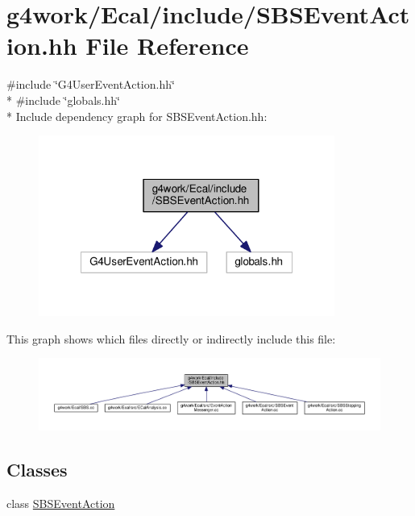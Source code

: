 \hypertarget{_s_b_s_event_action_8hh}{\section{g4work/\-Ecal/include/\-S\-B\-S\-Event\-Action.hh File Reference}
\label{_s_b_s_event_action_8hh}
}
{\ttfamily \#include \char`\"{}G4\-User\-Event\-Action.\-hh\char`\"{}}\\*
{\ttfamily \#include \char`\"{}globals.\-hh\char`\"{}}\\*
Include dependency graph for S\-B\-S\-Event\-Action.\-hh\-:\nopagebreak
\begin{figure}[H]
\begin{center}
\leavevmode
\includegraphics[width=275pt]{_s_b_s_event_action_8hh__incl}
\end{center}
\end{figure}
This graph shows which files directly or indirectly include this file\-:\nopagebreak
\begin{figure}[H]
\begin{center}
\leavevmode
\includegraphics[width=350pt]{_s_b_s_event_action_8hh__dep__incl}
\end{center}
\end{figure}
\subsection*{Classes}
\begin{DoxyCompactItemize}
\item 
class \hyperlink{class_s_b_s_event_action}{S\-B\-S\-Event\-Action}
\end{DoxyCompactItemize}
